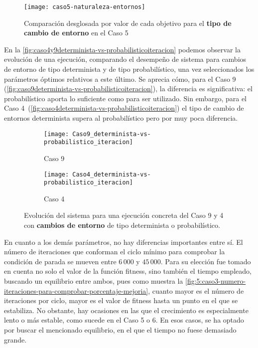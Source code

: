 \begin{figure}
	\centering
	\texttt{[image: caso5-naturaleza-entornos]}
	\caption{Comparación desglosada por valor de cada objetivo para el \textbf{tipo de cambio de entorno} en el Caso 5}
	\label{fig:caso5-naturaleza-entornos}
\end{figure}

En la \autoref{fig:caso4y9determinista-vs-probabilisticoiteracion} podemos observar la evolución de una ejecución, comparando el desempeño de sistema para cambios de entorno de tipo determinista y de tipo probabilístico, una vez seleccionados los parámetros óptimos relativos a este último. Se aprecia cómo, para el Caso 9  (\autoref{fig:caso9determinista-vs-probabilisticoiteracion}), la diferencia es significativa: el probabilístico aporta lo suficiente como para ser utilizado. Sin embargo, para el Caso 4~(\autoref{fig:caso4determinista-vs-probabilisticoiteracion}) el tipo de cambio de entornos determinista supera al probabilístico pero por muy poca diferencia.

\begin{figure}
	\begin{subfigure}{\linewidth}
		\centering
		\texttt{[image: Caso9\_determinista-vs-probabilistico\_iteracion]}
		\caption{Caso 9}
		\label{fig:caso9determinista-vs-probabilisticoiteracion}
	\end{subfigure}

	\begin{subfigure}{\linewidth}
		\centering
		\texttt{[image: Caso4\_determinista-vs-probabilistico\_iteracion]}
		\caption{Caso 4}
		\label{fig:caso4determinista-vs-probabilisticoiteracion}
	\end{subfigure}
	\caption{Evolución del sistema para una ejecución concreta del Caso 9 y 4 con \textbf{cambios de entorno} de tipo determinista o probabilístico.}
	\label{fig:caso4y9determinista-vs-probabilisticoiteracion}
\end{figure}



En cuanto a los demás parámetros, no hay diferencias importantes entre sí. El número de iteraciones que conforman el ciclo mínimo para comprobar la condición de parada se mueven entre $6\,000$ y $45\,000$. Para su elección fue tomado en cuenta no solo el valor de la función fitness, sino también el tiempo empleado, buscando un equilibrio entre ambos, pues como muestra la \autoref{fig:5:caso3-numero-iteraciones-para-comprobar-porcentaje-mejoria}, cuanto mayor es el número de iteraciones por ciclo, mayor es el valor de fitness hasta un punto en el que se estabiliza. No obstante, hay ocasiones en las que el crecimiento es especialmente lento o más estable, como sucede en el Caso 5 o 6. En esos casos, se ha optado por buscar el mencionado equilibrio, en el que el tiempo no fuese demasiado grande.

